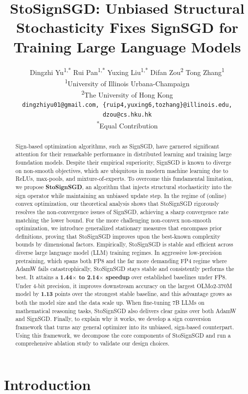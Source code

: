 \documentclass{article}
\title{\textbf{StoSignSGD: Unbiased Structural Stochasticity Fixes SignSGD for Training Large Language Models}}
\author{
  Dingzhi Yu\textsuperscript{1,*} \quad
  Rui Pan\textsuperscript{1,*} \quad
  Yuxing Liu\textsuperscript{1,*} \quad
  Difan Zou\textsuperscript{2} \quad
  Tong Zhang\textsuperscript{1} \\
  \textsuperscript{1}University of Illinois Urbana-Champaign \\
  \textsuperscript{2}The University of Hong Kong \\
  \normalsize\texttt{dingzhiyu01@gmail.com, \{ruip4,yuxing6,tozhang\}@illinois.edu, dzou@cs.hku.hk}\\
  \textsuperscript{*}Equal Contribution
}
\date{}
\begin{document}
\maketitle

\begin{abstract}
    Sign-based optimization algorithms, such as SignSGD, have garnered significant attention for their remarkable performance in distributed learning and training large foundation models. Despite their empirical superiority, SignSGD is known to diverge on non-smooth objectives, which are ubiquitous in modern machine learning due to ReLUs, max-pools, and mixture-of-experts. To overcome this fundamental limitation, we propose \textbf{StoSignSGD}, an algorithm that injects structural stochasticity into the sign operator while maintaining an unbiased update step. In the regime of (online) convex optimization, our theoretical analysis shows that StoSignSGD rigorously resolves the non-convergence issues of SignSGD, achieving a sharp convergence rate matching the lower bound. For the more challenging non-convex non-smooth optimization, we introduce generalized stationary measures that encompass prior definitions, proving that StoSignSGD improves upon the best-known complexity bounds by dimensional factors. Empirically, StoSignSGD is stable and efficient across diverse large language model (LLM) training regimes. In aggressive low-precision pretraining, which spans both FP8 and the far more demanding FP4 regime where AdamW fails catastrophically, StoSignSGD stays stable and consistently performs the best. It attains a \textbf{1.44$\times$ to 2.14$\times$ speedup} over established baselines under FP8. Under 4-bit precision, it improves downstream accuracy on the largest OLMo2-370M model by \textbf{1.13} points over the strongest stable baseline, and this advantage grows as both the model size and the data scale up. When fine-tuning 7B LLMs on mathematical reasoning tasks, StoSignSGD also delivers clear gains over both AdamW and SignSGD. Finally, to explain why it works, we develop a sign conversion framework that turns any general optimizer into its unbiased, sign-based counterpart. Using this framework, we decompose the core components of StoSignSGD and run a comprehensive ablation study to validate our design choices.  
\end{abstract}

\section{Introduction}
\end{document}
